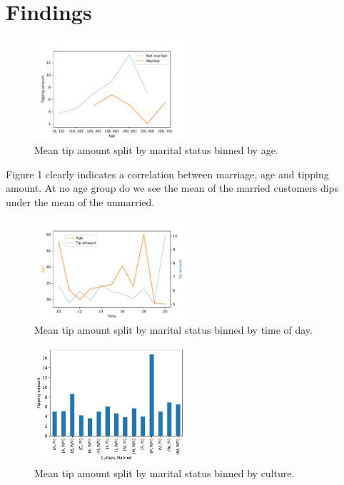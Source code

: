 \documentclass[twoside,twocolumn]{article}
\begin{document}

\section{Findings}

\begin{figure}[h]
  \centering
  \includegraphics[width=0.5\textwidth]{figures/tip_amount_by_age.pdf}
  \caption{Mean tip amount split by marital status binned by age.}
  \label{fig:tip-amount-by-age}
\end{figure}

Figure 1 clearly indicates a correlation between marriage, age and tipping amount. At no age group do we see the mean of the married customers dips under the mean of the unmarried.

\begin{figure}[h]
  \centering
  \includegraphics[width=0.5\textwidth]{figures/time_of_day_and_age.pdf}
  \caption{Mean tip amount split by marital status binned by time of day.}
  \label{fig:time-of-day-and-age}
\end{figure}

\begin{figure}[h]
  \centering
  \includegraphics[width=0.5\textwidth]{figures/culture_impact.pdf}
  \caption{Mean tip amount split by marital status binned by culture.}
  \label{fig:culture-impact}
\end{figure}
\end{document}
